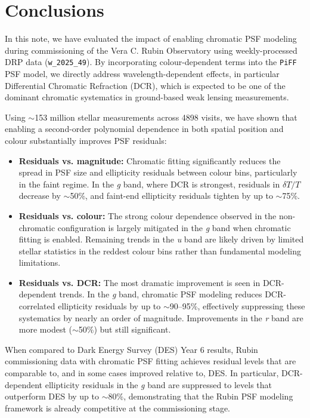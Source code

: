 \section{Conclusions}

In this note, we have evaluated the impact of enabling chromatic PSF modeling during commissioning of the Vera C. Rubin Observatory using weekly-processed DRP data (\texttt{w\_2025\_49}). By incorporating colour-dependent terms into the \texttt{PiFF} PSF model, we directly address wavelength-dependent effects, in particular Differential Chromatic Refraction (DCR), which is expected to be one of the dominant chromatic systematics in ground-based weak lensing measurements.

Using $\sim$153 million stellar measurements across 4898 visits, we have shown that enabling a second-order polynomial dependence in both spatial position and colour substantially improves PSF residuals:

\begin{itemize}
    \item \textbf{Residuals vs. magnitude:} Chromatic fitting significantly reduces the spread in PSF size and ellipticity residuals between colour bins, particularly in the faint regime. In the {\it g} band, where DCR is strongest, residuals in $\delta T/T$ decrease by $\sim$50\%, and faint-end ellipticity residuals tighten by up to $\sim$75\%.
    
    \item \textbf{Residuals vs. colour:} The strong colour dependence observed in the non-chromatic configuration is largely mitigated in the {\it g} band when chromatic fitting is enabled. Remaining trends in the {\it u} band are likely driven by limited stellar statistics in the reddest colour bins rather than fundamental modeling limitations.
    
    \item \textbf{Residuals vs. DCR:} The most dramatic improvement is seen in DCR-dependent trends. In the {\it g} band, chromatic PSF modeling reduces DCR-correlated ellipticity residuals by up to $\sim$90--95\%, effectively suppressing these systematics by nearly an order of magnitude. Improvements in the {\it r} band are more modest ($\sim$50\%) but still significant.
\end{itemize}

When compared to Dark Energy Survey (DES) Year 6 results, Rubin commissioning data with chromatic PSF fitting achieves residual levels that are comparable to, and in some cases improved relative to, DES. In particular, DCR-dependent ellipticity residuals in the {\it g} band are suppressed to levels that outperform DES by up to $\sim$80\%, demonstrating that the Rubin PSF modeling framework is already competitive at the commissioning stage.

